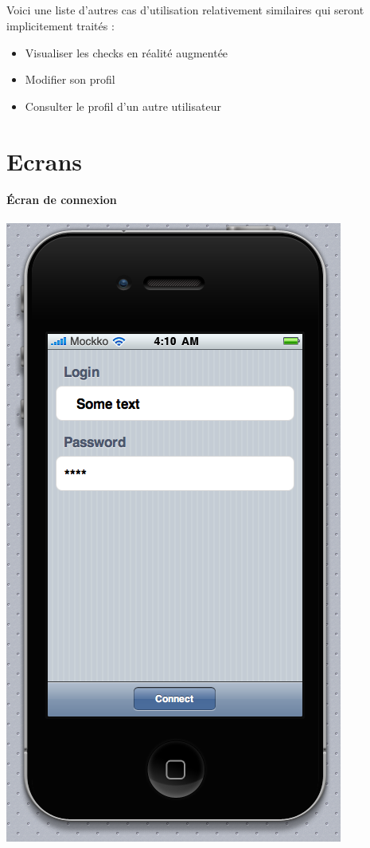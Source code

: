 \documentclass[a4paper,12pt]{report}
\begin{document}
\begin{onehalfspace}
\paragraph*{}
Voici une liste d'autres cas d'utilisation relativement similaires qui seront implicitement traités :
\begin{itemize}
  \item Visualiser les checks en réalité augmentée
  \item Modifier son profil
  \item Consulter le profil d'un autre utilisateur
\end{itemize}

\chapter{Ecrans} %
\label{cha:ecrans_suppl_mentaires}

\setcounter{hauteurscreen}{17}

\subsubsection{Écran de connexion}
\begin{center}
\includegraphics[height=\thehauteurscreen cm]{img/1_login.png}
\end{center}


\end{onehalfspace}
\end{document}
